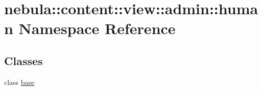 \hypertarget{namespacenebula_1_1content_1_1view_1_1admin_1_1human}{
\section{nebula::content::view::admin::human Namespace Reference}
\label{namespacenebula_1_1content_1_1view_1_1admin_1_1human}
}
\subsection*{Classes}
\begin{DoxyCompactItemize}
\item 
class \hyperlink{classnebula_1_1content_1_1view_1_1admin_1_1human_1_1base}{base}
\end{DoxyCompactItemize}
